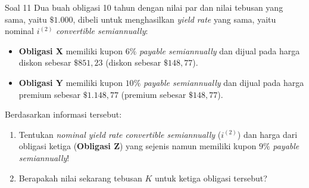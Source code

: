 \documentclass[11pt,a4paper]{article}
\begin{document}
\begin{problembox}{Soal 11}
Dua buah obligasi 10 tahun dengan nilai par dan nilai tebusan yang sama, yaitu $\$1.000$, dibeli untuk menghasilkan \textit{yield rate} yang sama, yaitu nominal $i^{(2)}$ \textit{convertible semiannually}:
\begin{itemize}
    \item \textbf{Obligasi X} memiliki kupon $6\%$ \textit{payable semiannually} dan dijual pada harga diskon sebesar $\$851{,}23$ (diskon sebesar $\$148{,}77$).
    \item \textbf{Obligasi Y} memiliki kupon $10\%$ \textit{payable semiannually} dan dijual pada harga premium sebesar $\$1.148{,}77$ (premium sebesar $\$148{,}77$).
\end{itemize}
Berdasarkan informasi tersebut:
\begin{enumerate}[label=(\alph*)]
    \item Tentukan \textit{nominal yield rate convertible semiannually} ($i^{(2)}$) dan harga dari obligasi ketiga (\textbf{Obligasi Z}) yang sejenis namun memiliki kupon $9\%$ \textit{payable semiannually}!
    \item Berapakah nilai sekarang tebusan $K$ untuk ketiga obligasi tersebut?
\end{enumerate}
\end{problembox}
\end{document}
